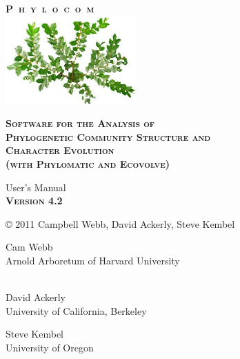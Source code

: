 \documentclass[12pt,letterpaper]{article}
\newcommand{\phylocomversion}{4.2}
\begin{document}
\sloppy
\thispagestyle{empty}

\begin{center}
{\sffamily \bfseries \scshape {\huge P~h~y~l~o~c~o~m \\}}
\bigskip \bigskip
\includegraphics[width=5cm]{img/phylocom.jpg}
\bigskip \bigskip

{\sffamily \bfseries \scshape {\Large Software for the Analysis of \\
Phylogenetic Community Structure and \\ Character Evolution \\ (with
Phylomatic and Ecovolve)\\}

\bigskip \bigskip

{\Large User's Manual \\}
\bigskip \bigskip
{\sffamily \bfseries \scshape \large Version \phylocomversion\\}
\bigskip \bigskip

{\textnormal \copyright} 2011 Campbell Webb, David Ackerly, Steve Kembel
\bigskip \bigskip

{\large Cam Webb\\}
Arnold Arboretum of Harvard University\\
\\

\bigskip \bigskip

{\large David Ackerly\\}
University of California, Berkeley\\

\bigskip \bigskip

{\large Steve Kembel\\}
University of Oregon\\
  }
\end{center}



\newpage

\pagestyle{fancy}
 \chead{} 
 \cfoot{\thepage} 
 \renewcommand{\headrulewidth}{0.4pt} 
 \renewcommand{\footrulewidth}{0.4pt} 
\end{document}
